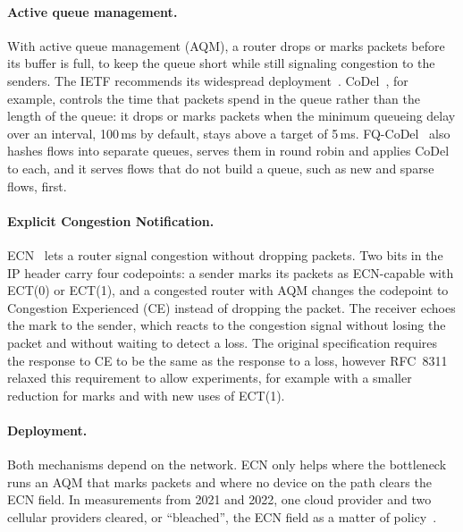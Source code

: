 \paragraph{Active queue management.} With active queue management (AQM), a router
drops or marks packets before its buffer is full, to keep the queue short while still
signaling congestion to the senders. The IETF recommends its widespread
deployment~\cite{rfc7567}. CoDel~\cite{rfc8289}, for example, controls the time that packets spend in
the queue rather than the length of the queue: it drops or marks packets when the
minimum queueing delay over an interval, 100\,ms by default, stays above a target of
5\,ms. FQ-CoDel~\cite{rfc8290} also hashes flows into separate queues, serves them in
round robin and applies CoDel to each, and it serves flows that do not build a
queue, such as new and sparse flows, first.

\paragraph{Explicit Congestion Notification.} ECN~\cite{rfc3168} lets a router signal congestion
without dropping packets. Two bits in the IP header carry four
codepoints: a sender marks its packets as ECN-capable with ECT(0) or ECT(1), and a
congested router with AQM changes the codepoint to Congestion Experienced (CE)
instead of dropping the packet. The receiver echoes the mark to the sender, which
reacts to the congestion signal without losing the packet and
without waiting to detect a loss. The original specification requires the response
to CE to be the same as the response to a loss, however RFC~8311~\cite{rfc8311} relaxed this
requirement to allow experiments, for example with a smaller reduction for marks and
with new uses of ECT(1).

\paragraph{Deployment.} Both mechanisms depend on the network. ECN only helps where
the bottleneck runs an AQM that marks packets and where no device on the path clears
the ECN field. In measurements from 2021 and 2022, one cloud provider and two cellular
providers cleared, or ``bleached'', the ECN field as a matter of policy~\cite{lim2022fresh}. 


